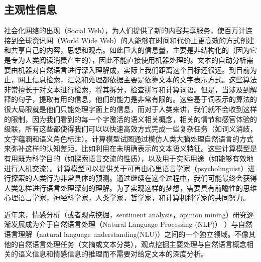 \subsection{主观性信息}
社会化网络的出现（Social Web），为人们提供了新的内容共享服务，使百万计连接到全球资讯网（World Wide Web）的人能够在时间和代价上更高效的方式创建和共享自己的内容，思想和观点。如此巨大的信息量，主要是非结构化的（因为它是专为人类阅读消费产生的），因此不能直接使用机器处理的。文本的自动分析需要由机器对自然语言进行深入理解成，实际上我们距离这个目标还很远。到目前为止，网上信息检索，汇总和处理都依据主要是依靠文本的文字表示方式。这些算法非常擅长于对文本进行检索，将其拆分，检查拼写和计算词语。但是，当涉及到解释的句子，提取有用的信息，他们的能力是非常有限的。这些基于词表示的算法的很大局限就是他们只能处理字面上的信息，而对于人类来讲，我们就不会收到这样的限制，因为我们看到的每一个字激活的语义相关概念，相关的情节和感官体验的级联，所有这些都使得我们可以以快速高效方式完成一些复杂任务（如词义消歧，文字蕴涵和语义角色标注）。计算模型试图通过模仿人类大脑处理自然语言的方式来弥补这样的认知差距，比如利用在未明确表示的文本语义特征。这些计算模型是有用既为科学目的（如探索语言交流的性质），以及用于实际用途（如能够有效地进行人机交流）。计算模型可以提供关于可再由心里语言学家（psycholinguist）进行探索的人类行为非常具体的预测。通过继续在这个过程中，我们可能最终会获得人类怎样进行语言处理深刻的理解。为了实现这样的梦想，需要具有前瞻性的思维心理语言学家，神经科学家，人类学家，哲学家，和计算机科学家的共同努力。

近年来，情感分析（或者观点挖掘，sentiment analysis，opinion mining）研究逐渐发展成为介于自然语言处理（Natural Language Processing (NLP)） ）与自然语言理解（natural language understanding(NLU)）之间的一个独立领域。不像其他的自然语言处理任务（文摘或文本分类），观点挖掘主要处理与自然语言概念相关的语义信息和情感信息的推理而不需要对给定文本的深度分析。

